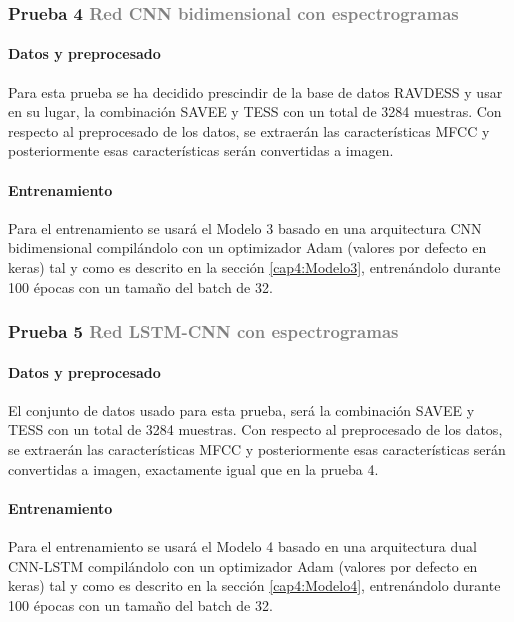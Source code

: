 \documentclass[11pt,a4paper,spanish]{book}
\begin{document}
	\subsubsection{\large Prueba 4 {\normalsize \textcolor{Gray}{Red CNN bidimensional con espectrogramas}}}
	\hfill\begin{minipage}{\dimexpr\textwidth-1cm}
		
		\paragraph{Datos y preprocesado} Para esta prueba se ha decidido prescindir de la base de datos RAVDESS y usar en su lugar, la combinación SAVEE y TESS con un total de 3284 muestras. Con respecto al preprocesado de los datos, se extraerán las características MFCC y posteriormente esas características serán convertidas a imagen.\\
		
		\paragraph{Entrenamiento} Para el entrenamiento se usará el Modelo 3 basado en una arquitectura CNN bidimensional compilándolo con un optimizador Adam (valores por defecto en keras) tal y como es descrito en la sección \ref{cap4:Modelo3}, entrenándolo durante 100 épocas con un tamaño del batch de 32.
	\end{minipage}


	\subsubsection[]{\large Prueba 5 {\normalsize \textcolor{Gray}{Red LSTM-CNN con espectrogramas}}}
	
	\hfill\begin{minipage}{\dimexpr\textwidth-1cm}
		
		\paragraph{Datos y preprocesado} El conjunto de datos usado para esta prueba, será la combinación SAVEE y TESS con un total de 3284 muestras. Con respecto al preprocesado de los datos, se extraerán las características MFCC y posteriormente esas características serán convertidas a imagen, exactamente igual que en la prueba 4.\\
		
		\paragraph{Entrenamiento} Para el entrenamiento se usará el Modelo 4 basado en una arquitectura dual CNN-LSTM compilándolo con un optimizador Adam (valores por defecto en keras) tal y como es descrito en la sección \ref{cap4:Modelo4}, entrenándolo durante 100 épocas con un tamaño del batch de 32.
		
	\end{minipage}
\end{document}

